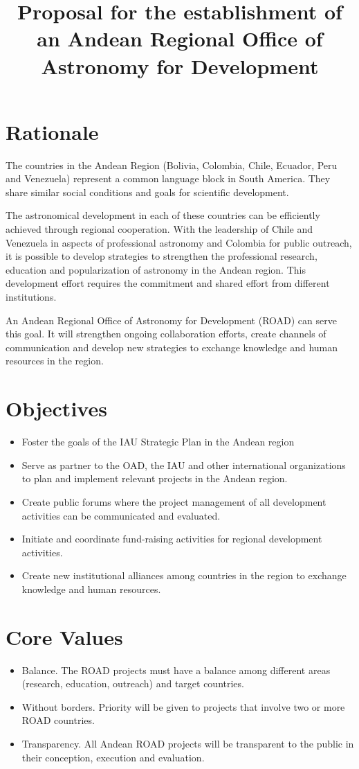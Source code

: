 \documentclass[12pt]{article}
\title{Proposal for the establishment of an Andean Regional Office of
  Astronomy for Development}
\begin{document}
\maketitle
\tableofcontents
\section{Rationale}

The countries in the Andean Region (Bolivia, Colombia, Chile, Ecuador,
Peru and Venezuela) represent a common language block in South
America. They share similar social conditions and goals for scientific
development.  

The astronomical development in each of these countries can be
efficiently achieved through regional cooperation. With the leadership
of Chile and Venezuela in aspects of professional astronomy and
Colombia for public outreach, it is possible to develop strategies to
strengthen the professional research, education and popularization of
astronomy in the Andean region. This development effort requires the
commitment and shared effort from different institutions. 

An Andean Regional Office of Astronomy for Development (ROAD) can
serve this goal.  It will strengthen ongoing collaboration efforts,
create channels of communication and develop new strategies to
exchange knowledge and human resources in the region.  

\section{Objectives}
\begin{itemize}
\item
Foster the goals of the IAU Strategic Plan in the Andean region
\item
Serve as partner to the OAD, the IAU and other international
organizations to plan and implement relevant projects in the Andean
region. 
\item
Create public forums where the project management of all development
activities can be communicated and evaluated. 
\item
Initiate and coordinate fund-raising activities for regional
development activities. 
\item
Create new institutional alliances among countries in the region to
exchange knowledge and human resources. 
\end{itemize}

\section{Core Values}
\begin{itemize}
\item 
Balance. The ROAD projects must have a balance among different areas
(research, education, outreach) and target countries. 
\item
Without borders. Priority will be given to projects that involve two
or more ROAD countries. 
\item
Transparency. All Andean ROAD projects will be transparent to the
public in their conception, execution and evaluation. 
\end{itemize}
\end{document}
